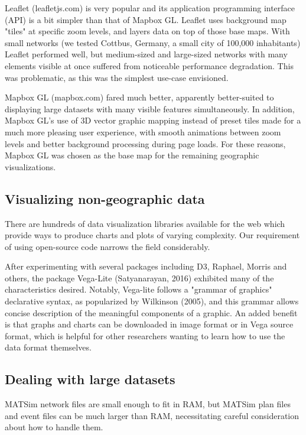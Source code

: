 \documentclass[Afour,sageh,times]{sagej}
\begin{document}
Leaflet (leafletjs.com) is very popular and its application programming interface (API) is a bit simpler than that of Mapbox GL. Leaflet uses background map "tiles" at specific zoom levels, and layers data on top of those base maps. With small networks (we tested Cottbus, Germany, a small city of 100,000 inhabitants) Leaflet performed well, but medium-sized and large-sized networks with many elements visible at once suffered from noticeable performance degradation. This was problematic, as this was the simplest use-case envisioned.

Mapbox GL (mapbox.com) fared much better, apparently better-suited to displaying large datasets with many visible features simultaneously. In addition, Mapbox GL's use of 3D vector graphic mapping instead of preset tiles made for a much more pleasing user experience, with smooth animations between zoom levels and better background processing during page loads. For these reasons, Mapbox GL was chosen as the base map for the remaining geographic visualizations.

\subsection{Visualizing non-geographic data}

There are hundreds of data visualization libraries available for the web which provide ways to produce charts and plots of varying complexity. Our requirement of using open-source code narrows the field considerably.

After experimenting with several packages including D3, Raphael, Morris and others, the package Vega-Lite (Satyanarayan, 2016) exhibited many of the characteristics desired. Notably, Vega-lite follows a "grammar of graphics" declarative syntax, as popularized by Wilkinson (2005), and this grammar allows concise description of the meaningful components of a graphic. An added benefit is that graphs and charts can be downloaded in image format or in Vega source format, which is helpful for other researchers wanting to learn how to use the data format themselves.

\subsection{Dealing with large datasets}

MATSim network files are small enough to fit in RAM, but MATSim plan files and event files can be much larger than RAM, necessitating careful consideration about how to handle them.
\end{document}
